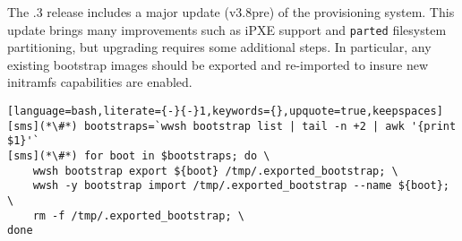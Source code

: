 The \OHPCVerTree{}.3 release includes a major update (v3.8pre) of the \Warewulf{}
provisioning system. This update brings many improvements such as iPXE support
and \texttt{parted} filesystem partitioning, but upgrading requires some
additional steps. In particular, any existing bootstrap images should be
exported and re-imported to insure new initramfs capabilities are enabled.

\begin{lstlisting}[language=bash,literate={-}{-}1,keywords={},upquote=true,keepspaces]
[sms](*\#*) bootstraps=`wwsh bootstrap list | tail -n +2 | awk '{print $1}'`
[sms](*\#*) for boot in $bootstraps; do \
    wwsh bootstrap export ${boot} /tmp/.exported_bootstrap; \
    wwsh -y bootstrap import /tmp/.exported_bootstrap --name ${boot}; \
    rm -f /tmp/.exported_bootstrap; \
done
\end{lstlisting}
